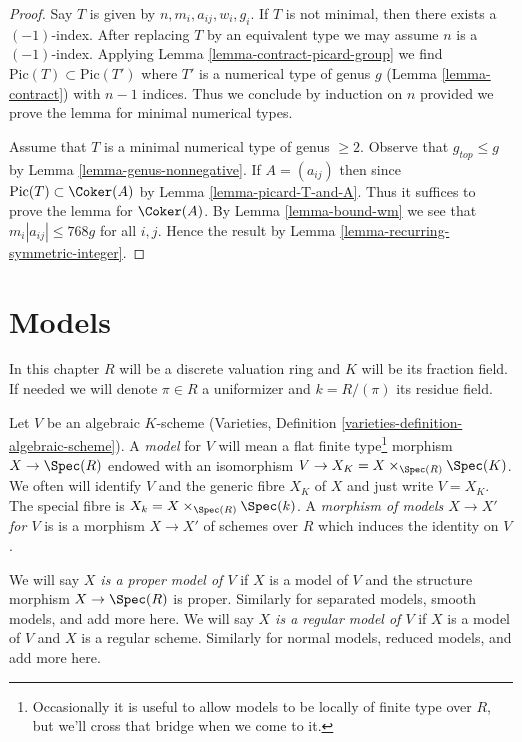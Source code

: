 \begin{proof}
Say $T$ is given by $n, m_i, a_{ij}, w_i, g_i$.
If $T$ is not minimal, then there exists a $(-1)$-index.
After replacing $T$ by an equivalent type we may assume
$n$ is a $(-1)$-index. Applying Lemma \ref{lemma-contract-picard-group}
we find $\text{Pic}(T) \subset \text{Pic}(T')$ where $T'$
is a numerical type of genus $g$ (Lemma \ref{lemma-contract})
with $n - 1$ indices. Thus we conclude by induction on $n$
provided we prove the lemma for minimal numerical types.

\medskip\noindent
Assume that $T$ is a minimal numerical type of genus $\geq 2$.
Observe that $g_{top} \leq g$ by Lemma \ref{lemma-genus-nonnegative}.
If $A = (a_{ij})$ then since $\text{Pic}(T) \subset \Coker(A)$
by Lemma \ref{lemma-picard-T-and-A}. Thus it suffices to prove
the lemma for $\Coker(A)$.
By Lemma \ref{lemma-bound-wm} we see that $m_i|a_{ij}| \leq 768g$ for
all $i, j$.
Hence the result by Lemma \ref{lemma-recurring-symmetric-integer}.
\end{proof}







\section{Models}
\label{section-models}

\noindent
In this chapter $R$ will be a discrete valuation ring and $K$ will
be its fraction field. If needed we will denote $\pi \in R$ a
uniformizer and $k = R/(\pi)$ its residue field.

\medskip\noindent
Let $V$ be an algebraic $K$-scheme
(Varieties, Definition \ref{varieties-definition-algebraic-scheme}).
A {\it model} for $V$ will
mean a flat finite type\footnote{Occasionally it is useful to
allow models to be locally of finite type over $R$, but we'll
cross that bridge when we come to it.}
morphism $X \to \Spec(R)$ endowed with
an isomorphism $V \to X_K = X \times_{\Spec(R)} \Spec(K)$. We often
will identify $V$ and the generic fibre $X_K$ of $X$ and
just write $V = X_K$.
The special fibre is $X_k = X \times_{\Spec(R)} \Spec(k)$.
A {\it morphism of models $X \to X'$ for $V$} is
is a morphism $X \to X'$ of schemes over $R$ which induces
the identity on $V$.

\medskip\noindent
We will say {\it $X$ is a proper model of $V$} if $X$ is a model
of $V$ and the structure morphism $X \to \Spec(R)$ is proper.
Similarly for separated models, smooth models, and add more here.
We will say {\it $X$ is a regular model of $V$} if $X$ is a model
of $V$ and $X$ is a regular scheme.
Similarly for normal models, reduced models, and add more here.

